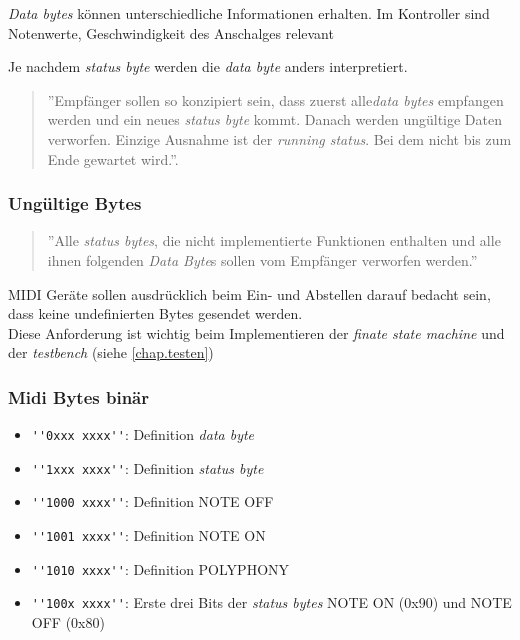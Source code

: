 \textit{Data bytes} können unterschiedliche Informationen erhalten. Im Kontroller sind Notenwerte, Geschwindigkeit des Anschalges relevant

Je nachdem \textit{status byte} werden die \textit{data byte} anders interpretiert. 

\begin{quote}
''Empfänger sollen so konzipiert sein, dass zuerst alle\textit{data bytes} empfangen werden und ein neues \textit{status byte} kommt. Danach werden ungültige Daten verworfen. Einzige Ausnahme ist der \textit{running status}. Bei dem nicht bis zum Ende gewartet wird.''\cite{Midi_specification}.
\end{quote}

\subsubsection*{Ungültige Bytes}

\begin{quote}
''Alle \textit{status bytes}, die nicht implementierte Funktionen enthalten und alle ihnen folgenden \textit{Data Byte}s sollen vom Empfänger verworfen werden.'' \cite{Midi_specification}
\end{quote}

MIDI Geräte sollen ausdrücklich beim Ein- und Abstellen darauf bedacht sein, dass keine undefinierten Bytes gesendet werden\cite{Midi_specification}.\\
Diese Anforderung ist wichtig beim Implementieren der \textit{finate state machine} und der \textit{testbench} (siehe \ref{chap.testen})

\subsubsection*{Midi Bytes binär}\label{midi_binaer}

\begin{itemize}
	\item \lstinline|''0xxx xxxx''|: Definition \textit{data byte}
	\item \lstinline|''1xxx xxxx''|: Definition \textit{status byte}
	\item \lstinline|''1000 xxxx''|: Definition NOTE OFF
	\item \lstinline|''1001 xxxx''|: Definition NOTE ON
	\item \lstinline|''1010 xxxx''|: Definition POLYPHONY
	\item \lstinline|''100x xxxx''|: Erste drei Bits der \textit{status bytes} NOTE ON (0x90) und NOTE OFF (0x80)
\end{itemize}
\newpage
